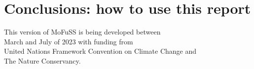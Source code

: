 \documentclass[english,a4paper,11pt,twoside]{report}
\begin{document}
\chapter{Conclusions: how to use this report}
\begin{flushleft}
	\blindtext[3]
\end{flushleft}
\FloatBarrier

%
% 
\listoffigures
\listoftables

\newpage
\pagestyle{empty}
\vspace*{\fill}
\begin{center}
	This version of MoFuSS is being developed between\\
	March and July of 2023 with funding from\\
	United Nations Framework Convention on Climate Change and\\ 
	The Nature Conservancy.	
	\label{lastpage}
\end{center}
\vspace*{\fill}
\end{document}
